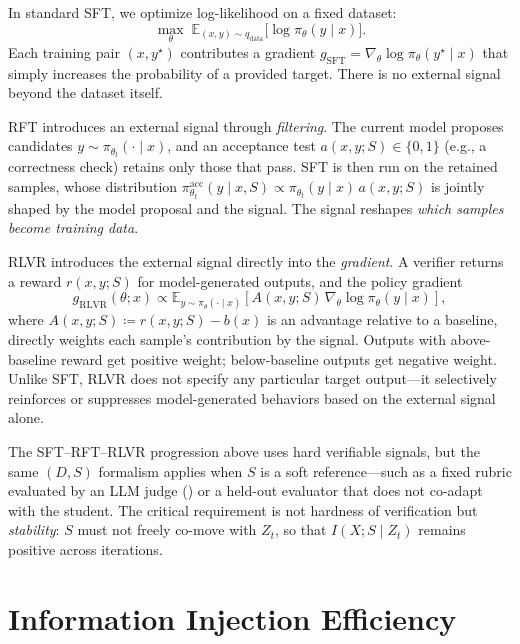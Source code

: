 \documentclass{article}
\theoremstyle{plain}
\theoremstyle{definition}
\theoremstyle{remark}
\begin{document}
In standard SFT, we optimize log-likelihood on a fixed dataset:
\[
\max_{\theta}\; \mathbb{E}_{(x,y)\sim q_{\text{data}}}\bigl[\log \pi_\theta(y\mid x)\bigr].
\]
Each training pair $(x,y^\star)$ contributes a gradient $g_{\text{SFT}}=\nabla_\theta\log\pi_\theta(y^\star\mid x)$ that simply increases the probability of a provided target. There is no external signal beyond the dataset itself.

RFT introduces an external signal through \textit{filtering}. The current model proposes candidates $y\sim\pi_{\theta_t}(\cdot\mid x)$, and an acceptance test $a(x,y;S)\in\{0,1\}$ (e.g., a correctness check) retains only those that pass. SFT is then run on the retained samples, whose distribution $\pi^{\text{acc}}_{\theta_t}(y\mid x,S)\propto \pi_{\theta_t}(y\mid x)\,a(x,y;S)$ is jointly shaped by the model proposal and the signal. The signal reshapes \textit{which samples become training data}.

RLVR introduces the external signal directly into the \textit{gradient}. A verifier returns a reward $r(x,y;S)$ for model-generated outputs, and the policy gradient
\[
g_{\text{RLVR}}(\theta; x)
\propto \mathbb{E}_{y\sim \pi_\theta(\cdot\mid x)}\!\left[
A(x,y;S)\,\nabla_\theta \log \pi_\theta(y\mid x)
\right],
\]
where $A(x,y;S)\coloneqq r(x,y;S)-b(x)$ is an advantage relative to a baseline, directly weights each sample's contribution by the signal. Outputs with above-baseline reward get positive weight; below-baseline outputs get negative weight. Unlike SFT, RLVR does not specify any particular target output---it selectively reinforces or suppresses model-generated behaviors based on the external signal alone.

The SFT--RFT--RLVR progression above uses hard verifiable signals, but the same $(D,S)$ formalism applies when $S$ is a soft reference---such as a fixed rubric evaluated by an LLM judge () or a held-out evaluator that does not co-adapt with the student. The critical requirement is not hardness of verification but \textit{stability}: $S$ must not freely co-move with $Z_t$, so that $I(X;S \mid Z_t)$ remains positive across iterations.

\section{Information Injection Efficiency}
\label{sec:efficiency}
\end{document}
